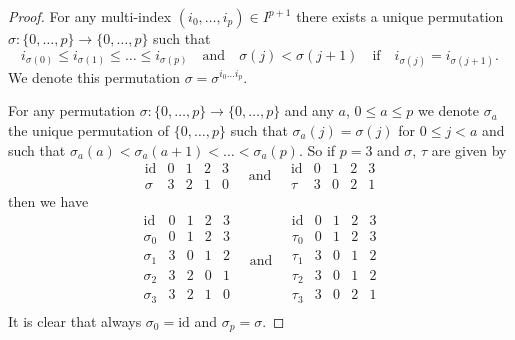 \begin{proof}
For any multi-index $(i_0, \ldots, i_p) \in I^{p + 1}$ there exists
a unique permutation $\sigma : \{0, \ldots, p\} \to \{0, \ldots, p\}$
such that
$$
i_{\sigma(0)} \leq i_{\sigma(1)} \leq \ldots \leq i_{\sigma(p)}
\quad
\text{and}
\quad
\sigma(j) < \sigma(j + 1)
\quad
\text{if}
\quad
i_{\sigma(j)} = i_{\sigma(j + 1)}.
$$
We denote this permutation $\sigma = \sigma^{i_0 \ldots i_p}$.

\medskip\noindent
For any permutation $\sigma : \{0, \ldots, p\} \to \{0, \ldots, p\}$
and any $a$, $0 \leq a \leq p$ we denote $\sigma_a$
the unique permutation of $\{0, \ldots, p\}$ such that
$\sigma_a(j) = \sigma(j)$ for $0 \leq j < a$ and such that
$\sigma_a(a) < \sigma_a(a + 1) < \ldots < \sigma_a(p)$.
So if $p = 3$ and $\sigma$, $\tau$ are given by
$$
\begin{matrix}
\text{id} & 0 & 1 & 2 & 3 \\
\sigma & 3 & 2 & 1 & 0
\end{matrix}
\quad \text{and} \quad
\begin{matrix}
\text{id} & 0 & 1 & 2 & 3 \\
\tau & 3 & 0 & 2 & 1
\end{matrix}
$$
then we have
$$
\begin{matrix}
\text{id} & 0 & 1 & 2 & 3 \\
\sigma_0 & 0 & 1 & 2 & 3 \\
\sigma_1 & 3 & 0 & 1 & 2 \\
\sigma_2 & 3 & 2 & 0 & 1 \\
\sigma_3 & 3 & 2 & 1 & 0 \\
\end{matrix}
\quad \text{and} \quad
\begin{matrix}
\text{id} & 0 & 1 & 2 & 3 \\
\tau_0 & 0 & 1 & 2 & 3 \\
\tau_1 & 3 & 0 & 1 & 2 \\
\tau_2 & 3 & 0 & 1 & 2 \\
\tau_3 & 3 & 0 & 2 & 1 \\
\end{matrix}
$$
It is clear that always $\sigma_0 = \text{id}$ and $\sigma_p = \sigma$.


\end{proof}
